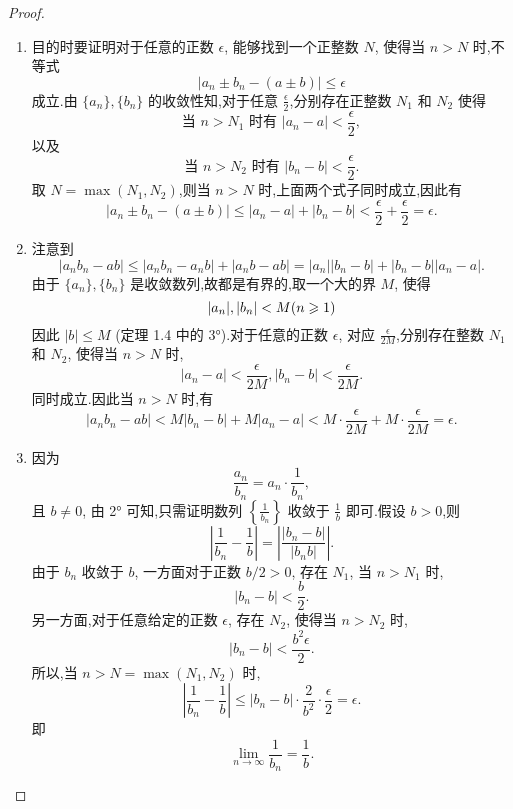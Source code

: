 \begin{proof}
    \begin{enumerate}
        \item 目的时要证明对于任意的正数 $\epsilon$, 能够找到一个正整数 $N$, 使得当 $n > N$ 时,不等式
        $$
        |a_n \pm b_n - (a \pm b)| \leq \epsilon
        $$
        成立.由 $\{a_n\}, \{b_n\}$ 的收敛性知,对于任意 $\frac{\epsilon}{2}$,分别存在正整数 $N_1$ 和 $N_2$ 使得
        $$
        \text{当 } n > N_1 \text{ 时有 } |a_n - a| < \frac{\epsilon}{2},
        $$
        以及
        $$
        \text{当 } n > N_2 \text{ 时有 } |b_n - b| < \frac{\epsilon}{2}.
        $$
        取 $N = \max(N_1, N_2)$,则当 $n > N$ 时,上面两个式子同时成立,因此有
        $$
        |a_n \pm b_n - (a \pm b)| \leq |a_n - a| + |b_n - b| < \frac{\epsilon}{2} + \frac{\epsilon}{2} = \epsilon.
        $$
        \item 注意到
        $$
        |a_n b_n - ab| \leq |a_n b_n - a_n b| + |a_n b - ab| = |a_n| |b_n - b| + |b_n - b| |a_n - a|.
        $$
        由于 $\{a_n\}, \{b_n\}$ 是收敛数列,故都是有界的,取一个大的界 $M$, 使得
        $$
        |a_n|, |b_n| < M (n \geqslant 1)
        $$
        因此 $|b| \leq M$ (定理 1.4 中的 3°).对于任意的正数 $\epsilon$, 对应 $\frac{\epsilon}{2M}$,分别存在整数 $N_1$ 和 $N_2$, 使得当 $n > N$ 时,
        $$
        |a_n - a| < \frac{\epsilon}{2M}, |b_n - b| < \frac{\epsilon}{2M}.
        $$
        同时成立.因此当 $n > N$ 时,有
        $$
        |a_n b_n - ab| < M |b_n - b| + M |a_n - a| < M \cdot \frac{\epsilon}{2M} + M \cdot \frac{\epsilon}{2M} = \epsilon.
        $$
        \item 因为
        $$
        \frac{a_n}{b_n} = a_n \cdot \frac{1}{b_n},
        $$
        且 $b \neq 0$, 由 2° 可知,只需证明数列 $\left\{\frac{1}{b_n}\right\}$ 收敛于 $\frac{1}{b}$ 即可.假设 $b > 0$,则
        $$
        \left| \frac{1}{b_n} - \frac{1}{b} \right| = \left| \frac{|b_n - b|}{|b_n b|} \right|.
        $$
        由于 $b_n$ 收敛于 $b$, 一方面对于正数 $b/2 > 0$, 存在 $N_1$, 当 $n > N_1$ 时,
        $$
        |b_n - b| < \frac{b}{2}.
        $$
        另一方面,对于任意给定的正数 $\epsilon$, 存在 $N_2$, 使得当 $n > N_2$ 时,
        $$
        |b_n - b| < \frac{b^2 \epsilon}{2}.
        $$
        所以,当 $n > N = \max(N_1, N_2)$ 时,
        $$
        \left| \frac{1}{b_n} - \frac{1}{b} \right| \leq |b_n - b| \cdot \frac{2}{b^2} \cdot \frac{\epsilon}{2} = \epsilon.
        $$
        即
        $$
        \lim_{n \to \infty} \frac{1}{b_n} = \frac{1}{b}.
        $$
        
    \end{enumerate}
    
\end{proof}

